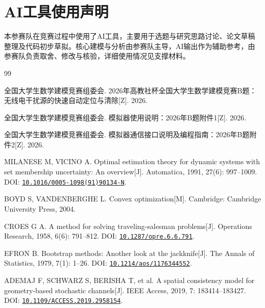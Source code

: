 \documentclass[UTF8,fontset=none,zihao=-4,a4paper]{ctexart}
\begin{document}
\section{AI工具使用声明}

本参赛队在竞赛过程中使用了AI工具，主要用于选题与研究思路讨论、论文草稿整理及代码初步草拟。核心建模与分析由参赛队主导，AI输出作为辅助参考，由参赛队负责取舍、修改与核验，详细使用情况见支撑材料。

\renewcommand{\refname}{参考文献}
\begin{thebibliography}{99}
\label{references}
\setlength{\itemsep}{3pt}
\setlength{\parskip}{0pt}

全国大学生数学建模竞赛组委会. 2026年高教社杯全国大学生数学建模竞赛B题：无线电干扰源的快速自动定位与清除[Z]. 2026.

全国大学生数学建模竞赛组委会. 模拟器使用说明：2026年B题附件1[Z]. 2026.

全国大学生数学建模竞赛组委会. 模拟器通信接口说明及编程指南：2026年B题附件2[Z]. 2026.

MILANESE M, VICINO A. Optimal estimation theory for dynamic systems with set membership uncertainty: An overview[J]. Automatica, 1991, 27(6): 997--1009. DOI: \href{https://doi.org/10.1016/0005-1098(91)90134-N}{\nolinkurl{10.1016/0005-1098(91)90134-N}}.

BOYD S, VANDENBERGHE L. Convex optimization[M]. Cambridge: Cambridge University Press, 2004.

CROES G A. A method for solving traveling-salesman problems[J]. Operations Research, 1958, 6(6): 791--812. DOI: \href{https://doi.org/10.1287/opre.6.6.791}{\nolinkurl{10.1287/opre.6.6.791}}.

EFRON B. Bootstrap methods: Another look at the jackknife[J]. The Annals of Statistics, 1979, 7(1): 1--26. DOI: \href{https://doi.org/10.1214/aos/1176344552}{\nolinkurl{10.1214/aos/1176344552}}.

ADEMAJ F, SCHWARZ S, BERISHA T, et al. A spatial consistency model for geometry-based stochastic channels[J]. IEEE Access, 2019, 7: 183414--183427. DOI: \href{https://doi.org/10.1109/ACCESS.2019.2958154}{\nolinkurl{10.1109/ACCESS.2019.2958154}}.

\end{thebibliography}

\clearpage
\begingroup
{}
\captionsetup{labelsep=quad}
\setlength{\parskip}{2pt}
\end{document}
